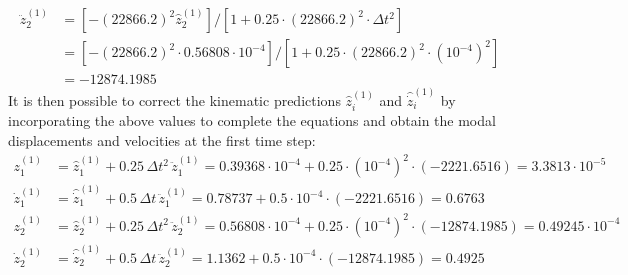 \documentclass[12pt]{article}
\begin{document}
\begin{equation*}
    \begin{aligned}
        \ddot{z}_2^{(1)} & = \left[- (22866.2)^2 \hat{z}_2^{(1)} \right] \big/ \left[ 1 + 0.25 \cdot (22866.2)^2 \cdot \Delta t^2 \right]                \\
                         & = \left[  - (22866.2)^2 \cdot 0.56808 \cdot 10^{-4} \right] \big/ \left[ 1 + 0.25 \cdot (22866.2)^2 \cdot (10^{-4})^2 \right] \\
                         & = -12874.1985
    \end{aligned}
\end{equation*}
It is then possible to correct the kinematic predictions $\hat{z}_i^{(1)}$ and $\hat{\dot{z}}_i^{(1)}$ by incorporating the above values to complete the equations and obtain the modal displacements and velocities at the first time step:
\begin{equation*}
    \begin{aligned}
        z_1^{(1)}       & = \hat{z}_1^{(1)} + 0.25 \, \Delta t^2 \, \ddot{z}_1^{(1)}
        = 0.39368 \cdot 10^{-4} + 0.25 \cdot (10^{-4})^2 \cdot (-2221.6516)
        = 3.3813 \cdot 10^{-5}                                                          \\
        \dot{z}_1^{(1)} & = \hat{\dot{z}}_1^{(1)} + 0.5 \, \Delta t \, \ddot{z}_1^{(1)}
        = 0.78737 + 0.5 \cdot 10^{-4} \cdot (-2221.6516)
        = 0.6763                                                                        \\
        z_2^{(1)}       & = \hat{z}_2^{(1)} + 0.25 \, \Delta t^2 \, \ddot{z}_2^{(1)}
        = 0.56808 \cdot 10^{-4} + 0.25 \cdot (10^{-4})^2 \cdot (-12874.1985)
        = 0.49245 \cdot 10^{-4}                                                         \\
        \dot{z}_2^{(1)} & = \hat{\dot{z}}_2^{(1)} + 0.5 \, \Delta t \, \ddot{z}_2^{(1)}
        = 1.1362 + 0.5 \cdot 10^{-4} \cdot (-12874.1985)
        = 0.4925
    \end{aligned}
\end{equation*}
\end{document}
